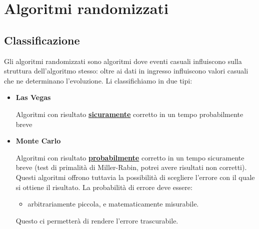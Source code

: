 \chapter{Algoritmi randomizzati}
\section{Classificazione}
Gli algoritmi randomizzati sono algoritmi dove eventi casuali influiscono sulla struttura dell'algoritmo stesso: oltre ai dati in ingresso influiscono valori casuali che ne determinano l'evoluzione. Li classifichiamo in due tipi:
\begin{itemize}
    \item \textbf{Las Vegas}
    
    Algoritmi con risultato \textbf{\underline{sicuramente}} corretto in un tempo probabilmente breve %
    
    \item \textbf{Monte Carlo}
    
    Algoritmi con risultato \textbf{\underline{probabilmente}} corretto in un tempo sicuramente breve (test di primalità di Miller-Rabin, potrei avere risultati non corretti). Questi algoritmi offrono tuttavia la possibilità di scegliere l'errore con il quale si ottiene il risultato. La probabilità di errore deve essere:
    \begin{itemize}
    	\item arbitrariamente piccola, e matematicamente misurabile.
    \end{itemize}
	Questo ci permetterà di rendere l'errore trascurabile.
\end{itemize}

